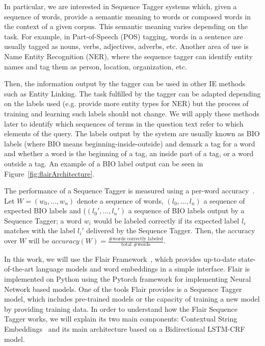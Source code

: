 In particular, we are interested in Sequence Tagger systems which, given a sequence of 
words, provide a semantic meaning to words or composed words in the context of a given 
corpus. This semantic meaning varies depending on the task. For example, in Part-of-Speech 
(POS) tagging, words in a sentence are usually tagged as nouns, verbs, adjectives, adverbs, 
etc. Another area of use is Name Entity Recognition (NER), where the sequence tagger can 
identify entity names and tag them as person, location, organization, etc. 

Then, the information output by the tagger can be used in other IE methods such as Entity 
Linking. The task fulfilled by the tagger can be adapted depending on the labels used 
(e.g. provide more entity types for NER) but the process of training and learning such 
labels should not change. We will apply these methods later to identify which sequences of 
terms in the question text refer to which elements of the query. The labels output by the 
system are usually known as BIO labels (where BIO means beginning-inside-outside) and 
demark a tag for a word and whether a word is the beginning of a tag, an inside part of a 
tag, or a word outside a tag. An example of a BIO label output can be seen in 
Figure~\ref{fig:flairArchitecture}.

The performance of a Sequence Tagger is measured using a per-word accuracy~\cite{seqlab:MarcusSM94}. 
Let $W=(w_0,\ldots,w_n)$ denote a sequence of words, $(l_0,\ldots,l_n)$ a sequence of 
expected BIO labels and ($(l_{0}',\ldots,l_{n}')$ a sequence of BIO labels output by a Sequence 
Tagger; a word $w_i$ would be labeled correctly if its expected label $l_i$ matches with the label 
$l_{i}'$ delivered by the Sequence Tagger. Then, the accuracy over $W$ will be $accuracy(W)=
\frac{\mbox{\#words correctly labeled}}{\mbox{total \# words}}$.

In this work, we will use the Flair Framework~\cite{seqlab:flair-AkbikBBRSV19}, which provides 
up-to-date state-of-the-art language models and word embeddings in a simple interface. Flair is 
implemented on Python using the Pytorch framework for implementing Neural Network based models. 
One of the tools Flair provides is a Sequence Tagger model, which includes pre-trained models or 
the capacity of training a new model by providing training data. In order to understand how the 
Flair Sequence Tagger works, we will explain its two main components: Contextual String 
Embeddings~\cite{seqlab:contextual-emb-AkbikBV18} and its main architecture based on a 
Bidirectional LSTM-CRF model.

